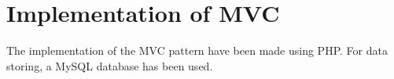 \section{Implementation of MVC}
The implementation of the MVC pattern have been made using PHP. For data storing, a MySQL database has been used.